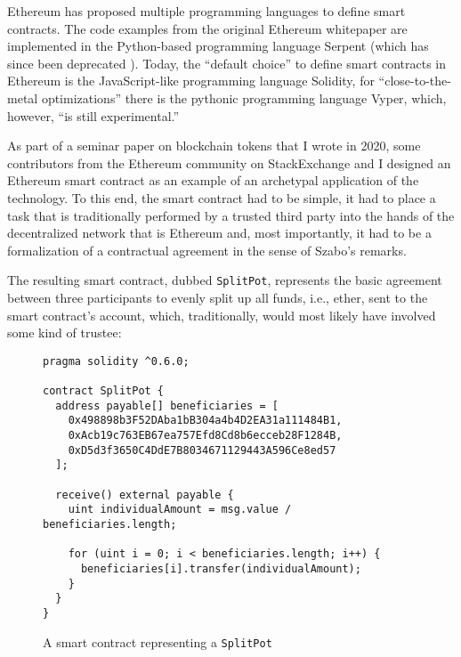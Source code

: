 Ethereum has proposed multiple programming languages to define smart contracts.
The code examples from the original Ethereum whitepaper are implemented in the Python-based programming language Serpent (which has since been deprecated \autocite{twitter2017serpentdeprecation}).
Today, the ``default choice'' to define smart contracts in Ethereum is the JavaScript-like programming language Solidity, for ``close-to-the-metal optimizations'' there is the pythonic programming language Vyper, which, however, ``is still experimental.'' \autocite{github2017serpentreadme}

As part of a seminar paper on blockchain tokens \autocite{github2020blockchaintokens} that I wrote in 2020, some contributors from the Ethereum community on StackExchange \autocite{stackexchange2020ethereumsmartcontract} and I designed an Ethereum smart contract as an example of an archetypal application of the technology.
To this end, the smart contract had to be simple, it had to place a task that is traditionally performed by a trusted third party into the hands of the decentralized network that is Ethereum and, most importantly, it had to be a formalization of a contractual agreement in the sense of Szabo's remarks.

The resulting smart contract, dubbed \texttt{SplitPot}, represents the basic agreement between three participants to evenly split up all funds, i.e., ether, sent to the smart contract's account, which, traditionally, would most likely have involved some kind of trustee:
\\
\begin{figure}[H]
	\begin{lstlisting}
pragma solidity ^0.6.0;

contract SplitPot {
  address payable[] beneficiaries = [
    0x498898b3F52DAba1bB304a4b4D2EA31a111484B1,
    0xAcb19c763EB67ea757Efd8Cd8b6ecceb28F1284B,
    0xD5d3f3650C4DdE7B8034671129443A596Ce8ed57
  ];

  receive() external payable {
    uint individualAmount = msg.value / beneficiaries.length;
    
    for (uint i = 0; i < beneficiaries.length; i++) {
      beneficiaries[i].transfer(individualAmount);
    }
  }
}
	\end{lstlisting}
	\caption*{A smart contract representing a \texttt{SplitPot}}
\end{figure}

